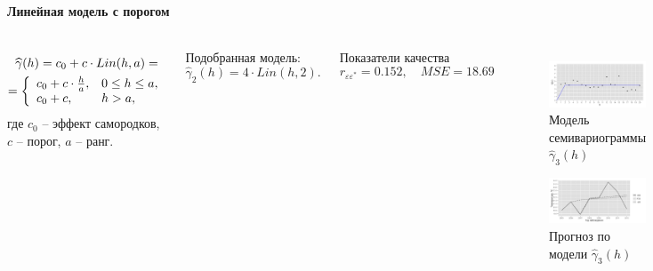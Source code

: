 \documentclass[notheorems]{beamer}
\theoremstyle{definition}
\theoremstyle{example}
\theoremstyle{plain}
\begin{document}
\begin{frame}
  \frametitle{\large\subsecname}
  \framesubtitle{Линейная модель с порогом}
  \begin{columns}[c]
  \column{3in}
  \begin{equation}\begin{gathered}
  \label{eq:linsill}
    \widehat{\gamma}(h) = c_0 + c \cdot Lin(h, a) = \\
    = \left\{
    \begin{array}{l l}
     c_0 + c \cdot \frac{h}{a}, & 0 \leq h \leq a, \\
     c_0 + c, & h > a,
    \end{array} \right.
  \end{gathered}\end{equation}
  где $ c_0 $ -- эффект самородков, $ c $ -- порог, $ a $ -- ранг.

  \vspace{0.5em}

  Подобранная модель:
  \begin{equation}
  \label{eq:gamma4}
    \widehat{\gamma}_2(h) = 4 \cdot Lin(h, 2).
  \end{equation}

  Показатели качества
  \begin{equation*}
    r_{\varepsilon\varepsilon^{*}} = 0.152, \quad MSE = 18.69
  \end{equation*}

  \column{3in}
  \vspace{-14.5pt}
  \begin{figure}[H]
    \includegraphics[width=0.9\linewidth]{../../figures/variogram/lin-fit-adapt-modeled.png} \\
    \caption{Модель семивариограммы $\widehat{\gamma}_3(h)$}
    \includegraphics[width=0.9\linewidth]{../../figures/variogram/lin-fit-adapt-cross-prediction.png}
    \caption{Прогноз по модели $\widehat{\gamma}_3(h)$}
  \end{figure}
  \end{columns}
\end{frame}
\end{document}
